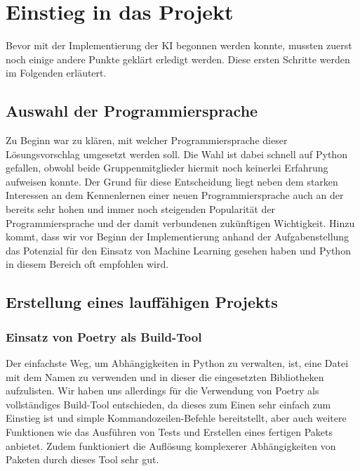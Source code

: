 \chapter{Einstieg in das Projekt}
\label{ch:planung}

Bevor mit der Implementierung der \ac{KI} begonnen werden konnte, mussten zuerst noch einige andere Punkte geklärt
\bzw erledigt werden.
Diese ersten Schritte werden im Folgenden erläutert.

\section{Auswahl der Programmiersprache}
\label{sec:auswahl-programmiersprache}

Zu Beginn war zu klären, mit welcher Programmiersprache dieser Lösungsvorschlag umgesetzt werden soll.
Die Wahl ist dabei schnell auf Python gefallen, obwohl beide Gruppenmitglieder hiermit noch keinerlei Erfahrung
aufweisen konnte.
Der Grund für diese Entscheidung liegt neben dem starken Interessen an dem Kennenlernen einer neuen Programmiersprache
auch an der bereits sehr hohen und immer noch steigenden Popularität der Programmiersprache und der damit verbundenen
zukünftigen Wichtigkeit.  
Hinzu kommt, dass wir vor Beginn der Implementierung anhand der Aufgabenstellung das Potenzial für den Einsatz von
Machine Learning gesehen haben und Python in diesem Bereich oft empfohlen wird.  

\section{Erstellung eines lauffähigen Projekts}
\label{sec:erstellung-projekt}

\subsection{Einsatz von Poetry als Build-Tool}
\label{subsec:poetry}

Der einfachste Weg, um Abhängigkeiten in Python zu verwalten, ist, eine Datei mit dem Namen  zu
verwenden und in dieser die eingesetzten Bibliotheken aufzulisten.
Wir haben uns allerdings für die Verwendung von Poetry als vollständiges Build-Tool entschieden, da dieses zum Einen
sehr einfach zum Einstieg ist und simple Kommandozeilen-Befehle bereitstellt, aber auch weitere Funktionen wie das
Ausführen von Tests und Erstellen eines fertigen Pakets anbietet.
Zudem funktioniert die Auflösung komplexerer Abhängigkeiten von Paketen durch dieses Tool sehr gut. 

